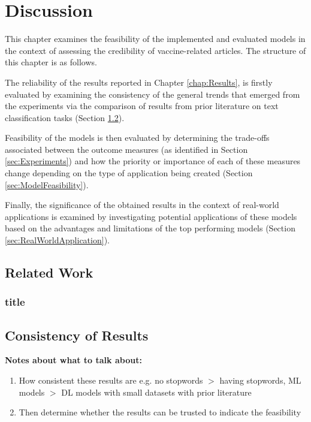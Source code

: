 \documentclass[a4paper,twoside,phd]{BYUPhys}
\begin{document}
\chapter{Discussion}
\label{chap:Discussion}

This chapter examines the feasibility of the implemented and evaluated models in the context of assessing the credibility of vaccine-related articles. The structure of this chapter is as follows. \newline

The reliability of the results reported in Chapter \ref{chap:Results}, is firstly evaluated by examining the consistency of the general trends that emerged from the experiments via the comparison of results from prior literature on text classification tasks (Section \ref{sec:ConsistencyOfResults}). \newline

Feasibility of the models is then evaluated by determining the trade-offs associated between the outcome measures (as identified in Section \ref{sec:Experiments}) and how the priority or importance of each of these measures change depending on the type of application being created (Section \ref{sec:ModelFeasibility}). \newline

Finally, the significance of the obtained results in the context of real-world applications is examined by investigating potential applications of these models based on the advantages and limitations of the top performing models (Section \ref{sec:RealWorldApplication}).

\section{Related Work}
\label{sec:DiscussionRelatedWork}

\subsection{title}

\section{Consistency of Results}
\label{sec:ConsistencyOfResults}

\iffalse
\textbf{Notes about what to talk about:}
\begin{enumerate}[-]
	\item How consistent these results are e.g. no stopwords $>$ having stopwords, ML models $>$ DL models with small datasets with prior literature
	\item Then determine whether the results can be trusted to indicate the feasibility
\end{enumerate}
\end{document}

